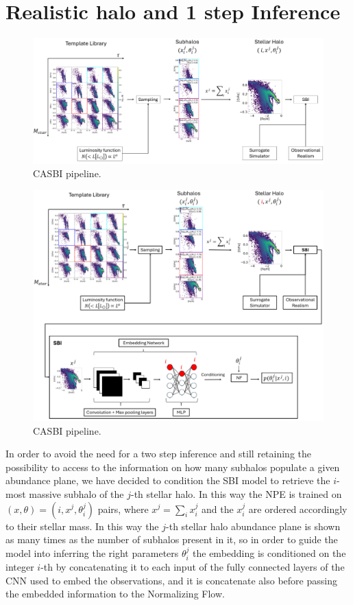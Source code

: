 \section{Realistic halo and 1 step Inference}\label{sec:Realistic halo and 1 step Inference}

\begin{figure}[ht]
    \centering
    \includegraphics[width=1\textwidth]{./figure/CASBI.png}
    \caption{CASBI pipeline.}
    \label{fig:CASBI}
\end{figure}

\begin{figure}[ht]
    \centering
    \includegraphics[width=1\textwidth]{./figure/CASBI_complete.png}
    \caption{CASBI pipeline.}
    \label{fig:CASBI}
\end{figure}

In order to avoid the need for a two step inference and still retaining the possibility to access to the information on how many subhalos populate a given abundance plane, we have decided to condition the SBI model to retrieve the $i$-most massive subhalo of the $j$-th stellar halo. In this way the NPE is trained on $(x, \theta) = (i, x^j, \theta_i^j)$ pairs, where $x^j = \sum_i x_i^j$ and the $x_i^j$ are ordered accordingly to their stellar mass. In this way the $j$-th stellar halo abundance plane is shown as many times as the number of subhalos present in it, so in order to guide the model into inferring the right parameters $\theta_i^j$ the embedding is conditioned on the integer $i$-th by concatenating it to each input of the fully connected layers of the CNN used to embed the observations, and it is concatenate also before passing the embedded information to the Normalizing Flow. 

